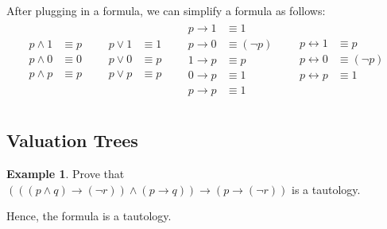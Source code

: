 \documentclass[11pt]{article}
\theoremstyle{definition}
\newtheorem{exmp}[thm]{Example}
\begin{document}
After plugging in a formula, we can simplify a formula as follows:
\begin{align*}
    \begin{aligned}
    p \wedge 1 & \equiv p \\
    p \wedge 0 & \equiv 0 \\
    p \wedge p & \equiv p \\
    \end{aligned}
    & &
    \begin{aligned}
    p \vee 1 & \equiv 1 \\
    p \vee 0 & \equiv p \\
    p \vee p & \equiv p \\
    \end{aligned}
    & & 
    \begin{aligned}
    p \rightarrow 1 & \equiv 1 \\
    p \rightarrow 0 & \equiv (\neg p) \\
    1 \rightarrow p & \equiv p \\
    0 \rightarrow p & \equiv 1 \\
    p \rightarrow p & \equiv 1 \\
    \end{aligned}
    & & 
    \begin{aligned}
    p \leftrightarrow 1 & \equiv p \\
    p \leftrightarrow 0 & \equiv (\neg p) \\
    p \leftrightarrow p & \equiv 1 \\
    \end{aligned}
\end{align*}

\newpage
\subsection{Valuation Trees}
\begin{exmp}
Prove that $(((p \wedge q) \rightarrow (\neg r)) \wedge (p \rightarrow q)) \rightarrow (p \rightarrow (\neg r))$ is a tautology.

\begin{center}
\end{center}

Hence, the formula is a tautology.
\end{exmp}
\end{document}
